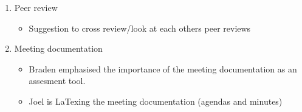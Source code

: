 \documentclass{article}
\begin{document}
\begin{flushleft}
\begin{enumerate}
  \item Peer review
    \begin{itemize}
      \item Suggestion to cross review/look at each others peer reviews
  \end{itemize}

  \item Meeting documentation
    \begin{itemize}
      \item Braden emphasised the importance of the meeting documentation
            as an assesment tool.
      \item Joel is LaTexing the meeting documentation (agendas and minutes)
  \end{itemize}

\end{enumerate}

\end{flushleft}
\end{document}
